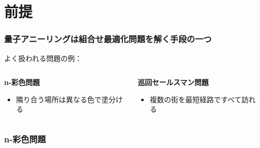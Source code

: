 \begin{frame}
\begin{columns}
\begin{column}{0.5\linewidth}
\begin{figure}
      \end{figure}
    \end{column}
  \end{columns}
\end{frame}

\section{前提}
\begin{frame}
  \frametitle{量子アニーリングは組合せ最適化問題を解く手段の一つ\cite{Kadowaki_1998}\cite{大関真之2018量子アニーリングによる組合せ最適化}}
  よく扱われる問題の例\cite{lucas2014ising}：\\
  \vspace{10mm}
  \begin{columns}
    \begin{column}{0.45\textwidth}
      \textbf{n-彩色問題}
      \begin{itemize}
          \item 隣り合う場所は異なる色で塗分ける
      \end{itemize}
    \end{column}

    \begin{column}{0.45\textwidth}
      \textbf{巡回セールスマン問題}
      \begin{itemize}
          \item 複数の街を最短経路ですべて訪れる
      \end{itemize}
    \end{column}
  \end{columns}
  \vspace{5mm}
\end{frame}

\begin{frame}
  \frametitle{n-彩色問題}
\end{frame}


